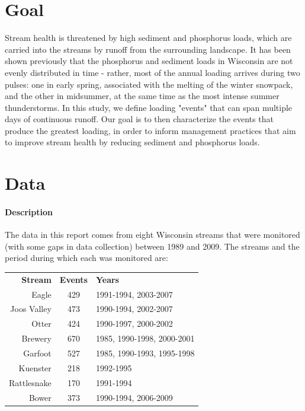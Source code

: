 \documentclass[10pt]{article}
\begin{document}
\section{Goal}
Stream health is threatened by high sediment and phosphorus loads, which are carried into the streams by runoff from the surrounding landscape. It has been shown previously\cite{Danz:2010} that the phosphorus and sediment loads in Wisconsin are not evenly distributed in time - rather, most of the annual loading arrives during two pulses: one in early spring, associated with the melting of the winter snowpack, and the other in midsummer, at the same time as the most intense summer thunderstorms. In this study, we define loading "events" that can span multiple days of continuous runoff. Our goal is to then characterize the events that produce the greatest loading, in order to inform management practices that aim to improve stream health by reducing sediment and phosphorus loads.\\

\section{Data}
\paragraph{Description}
The data in this report comes from eight Wisconsin streams that were monitored (with some gaps in data collection) between 1989 and 2009. The streams and the period during which each was monitored are:

\begin{table}[h]
\begin{center}
\begin{tabular}{r c l}
        \textbf{Stream}  & \textbf{Events} & \textbf{Years}\\
        Eagle & 429 & 1991-1994, 2003-2007\\
        Joos Valley & 473 & 1990-1994, 2002-2007\\
        Otter & 424 & 1990-1997, 2000-2002\\
        Brewery & 670 & 1985, 1990-1998, 2000-2001\\
        Garfoot & 527 & 1985, 1990-1993, 1995-1998\\
        Kuenster & 218 & 1992-1995\\
        Rattlesnake & 170 & 1991-1994\\
        Bower & 373 & 1990-1994, 2006-2009\\
    \end{tabular}
\end{center}
\end{table}
\end{document}
